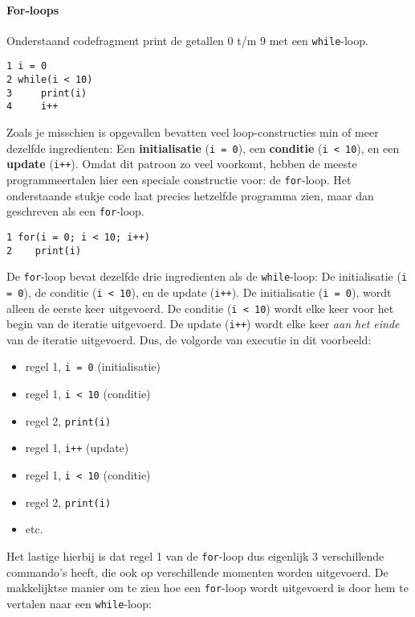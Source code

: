 \paragraph{For-loops}
Onderstaand codefragment print de getallen 0 t/m 9 met een \texttt{while}-loop.

\begin{verbatim}
1 i = 0
2 while(i < 10)
3     print(i)
4     i++
\end{verbatim}

Zoals je misschien is opgevallen bevatten veel loop-constructies min of meer dezelfde ingredienten: Een \textbf{initialisatie} (\texttt{i = 0}), een \textbf{conditie} (\texttt{i < 10}), en een \textbf{update} (\texttt{i++}). Omdat dit patroon zo veel voorkomt, hebben de meeste programmeertalen hier een speciale constructie voor: de \texttt{for}-loop. Het onderstaande stukje code laat precies hetzelfde programma zien, maar dan geschreven als een \texttt{for}-loop.

\begin{verbatim}
1 for(i = 0; i < 10; i++)
2    print(i)
\end{verbatim}

De \texttt{for}-loop bevat dezelfde drie ingredienten als de \texttt{while}-loop: De initialisatie (\texttt{i = 0}), de conditie (\texttt{i < 10}), en de update (\texttt{i++}). De initialisatie (\texttt{i = 0}), wordt alleen de eerste keer uitgevoerd. De conditie (\texttt{i < 10}) wordt elke keer voor het begin van de iteratie uitgevoerd. De update (\texttt{i++}) wordt elke keer \emph{aan het einde} van de iteratie uitgevoerd. Dus, de volgorde van executie in dit voorbeeld:

\begin{itemize}
\item regel 1, \texttt{i = 0} (initialisatie)
\item regel 1, \texttt{i < 10} (conditie)
\item regel 2, \texttt{print(i)}
\item regel 1, \texttt{i++} (update)
\item regel 1, \texttt{i < 10} (conditie)
\item regel 2, \texttt{print(i)}
\item etc.
\end{itemize}

Het lastige hierbij is dat regel 1 van de \texttt{for}-loop dus eigenlijk 3 verschillende commando's heeft, die ook op verschillende momenten worden uitgevoerd. De makkelijktse manier om te zien hoe een \texttt{for}-loop wordt uitgevoerd is door hem te vertalen naar een \texttt{while}-loop:

